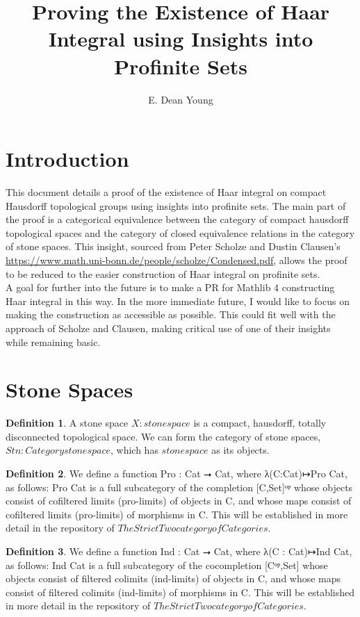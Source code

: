 \documentclass[13pt]{amsart}
\title{Proving the Existence of Haar Integral using Insights into Profinite Sets}
\author{E. Dean Young}
\theoremstyle{definition}
\newtheorem{definition}{Definition}
\begin{document}
\section{Introduction}

This document details a proof of the existence of Haar integral on compact Hausdorff topological groups using insights into profinite sets. The main part of the proof is a categorical equivalence between the category of compact hausdorff topological spaces and the category of closed equivalence relations in the category of stone spaces. This insight, sourced from Peter Scholze and Dustin Clausen's \href{Condensed Mathematics}{https://www.math.uni-bonn.de/people/scholze/Condensed.pdf}, allows the proof to be reduced to the easier construction of Haar integral on profinite sets.\\ 

A goal for further into the future is to make a PR for Mathlib 4 constructing Haar integral in this way. In the more immediate future, I would like to focus on making the construction as accessible as possible. This could fit well with the approach of Scholze and Clausen, making critical use of one of their insights while remaining basic.\\

\section{Stone Spaces}

\begin{definition}
A stone space $X : stonespace$ is a compact, hausdorff, totally disconnected topological space. We can form the category of stone spaces, $Stn : Category stonespace$, which has $stonespace$ as its objects.
\end{definition}

\begin{definition}
We define a function Pro : Cat ⭢ Cat,  where λ(C:Cat)↦Pro Cat, as follows: Pro Cat is a full subcategory of the completion [C,Set]ᵒᵖ whose objects consist of cofiltered limits (pro-limits) of objects in C, and whose maps consist of cofiltered limits (pro-limits) of morphisms in C. This will be established in more detail in the repository of ${TheStrictTwocategoryofCategories}$.
\end{definition}

\begin{definition}
We define a function Ind : Cat ⭢ Cat, where λ(C : Cat)↦Ind Cat, as follows: Ind Cat is a full subcategory of the cocompletion [Cᵒᵖ,Set] whose objects consist of filtered colimits (ind-limits) of objects in C, and whose maps consist of filtered colimits (ind-limits) of morphisms in C. This will be established in more detail in the repository of ${TheStrictTwocategoryofCategories}$.
\end{definition}
\end{document}
